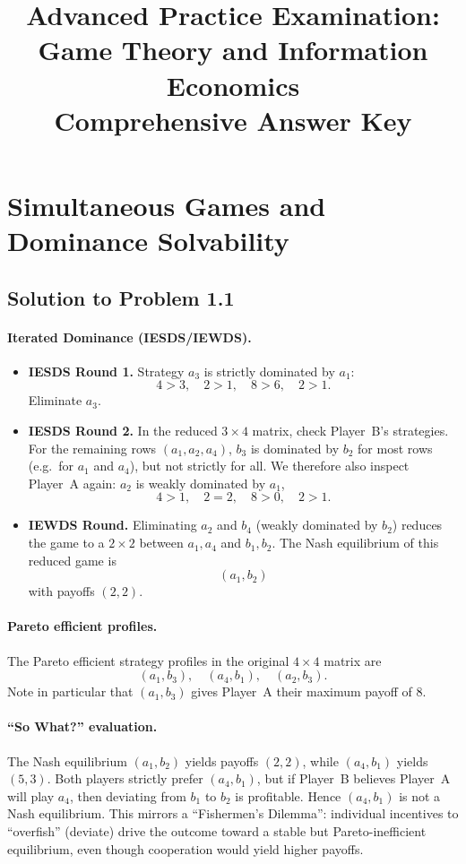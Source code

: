 \documentclass[12pt,a4paper]{article}
\title{\textbf{Advanced Practice Examination:}\\
       \Large Game Theory and Information Economics\\[0.5em]
       \normalsize Comprehensive Answer Key}
\author{ }
\date{ }
\begin{document}
\maketitle

\section{Simultaneous Games and Dominance Solvability}

\subsection*{Solution to Problem 1.1}

\paragraph{Iterated Dominance (IESDS/IEWDS).}
\begin{itemize}
  \item \textbf{IESDS Round 1.} Strategy \(a_3\) is strictly dominated by \(a_1\):
  \[
    4 > 3,\quad 2 > 1,\quad 8 > 6,\quad 2 > 1.
  \]
  Eliminate \(a_3\).
  \item \textbf{IESDS Round 2.} In the reduced \(3\times 4\) matrix, check Player~B's strategies. For the remaining rows \((a_1, a_2, a_4)\), \(b_3\) is dominated by \(b_2\) for most rows (e.g.\ for \(a_1\) and \(a_4\)), but not strictly for all. We therefore also inspect Player~A again: \(a_2\) is weakly dominated by \(a_1\),
  \[
    4 > 1,\quad 2 = 2,\quad 8 > 0,\quad 2 > 1.
  \]
  \item \textbf{IEWDS Round.} Eliminating \(a_2\) and \(b_4\) (weakly dominated by \(b_2\)) reduces the game to a \(2\times 2\) between \(a_1, a_4\) and \(b_1, b_2\). The Nash equilibrium of this reduced game is
  \[
    (a_1, b_2)
  \]
  with payoffs \((2,2)\).
\end{itemize}

\paragraph{Pareto efficient profiles.}
The Pareto efficient strategy profiles in the original \(4\times 4\) matrix are
\[
  (a_1, b_3),\quad (a_4, b_1),\quad (a_2, b_3).
\]
Note in particular that \((a_1, b_3)\) gives Player~A their maximum payoff of \(8\).

\paragraph{``So What?'' evaluation.}
The Nash equilibrium \((a_1, b_2)\) yields payoffs \((2,2)\), while \((a_4, b_1)\) yields \((5,3)\). Both players strictly prefer \((a_4, b_1)\), but if Player~B believes Player~A will play \(a_4\), then deviating from \(b_1\) to \(b_2\) is profitable. Hence \((a_4, b_1)\) is not a Nash equilibrium. This mirrors a ``Fishermen's Dilemma'': individual incentives to ``overfish'' (deviate) drive the outcome toward a stable but Pareto-inefficient equilibrium, even though cooperation would yield higher payoffs.
\end{document}
